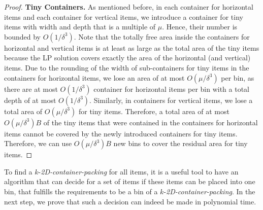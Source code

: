 \documentclass[a4paper,UKenglish,cleveref, autoref, thm-restate]{lipics-v2021}
\newcommand{\tin}{tiny\xspace}
\begin{document}
\begin{proof}
\textbf{Tiny Containers.} 
As mentioned before, in each container for horizontal items and each container for vertical items, we introduce a container for \tin items with width and depth that is a multiple of $\mu$.
Hence, their number is bounded by $O(1/\delta^3)$.
Note that the totally free area inside the containers for horizontal and vertical items is at least as large as the total area of the \tin items because the LP solution covers exactly the area of the horizontal (and vertical) items.
Due to the rounding of the width of sub-containers for \tin items in the containers for horizontal items, we lose an area of at most $O(\mu/\delta^3)$ per bin, as there are at most $O(1/\delta^3)$ container for horizontal items per bin with a total depth of at most $O(1/\delta^3)$.
Similarly, in containers for vertical items, we lose a total area of $O(\mu/\delta^3)$ for \tin items.
Therefore, a total area of at most $O(\mu/\delta^3) B$ of the \tin items that were contained in the containers for horizontal items cannot be covered by the newly introduced containers for \tin items. 
Therefore, we can use $O(\mu/\delta^3) B$ new bins to cover the residual area for \tin items. 
\end{proof}

To find a $k$-\emph{2D-container-packing} for all items, it is a useful tool to have an algorithm that can decide for a set of items if these items can be placed into one bin, that fulfills the requirements to be a bin of a $k$-\emph{2D-container-packing}.
In the next step, we prove that such a decision can indeed be made in polynomial time.
\end{document}
